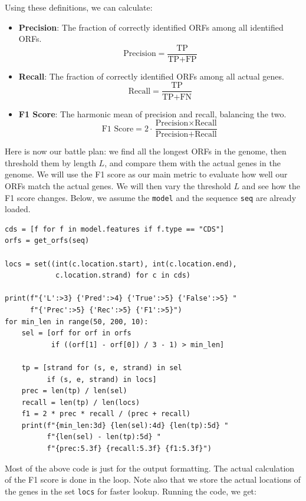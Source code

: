 Using these definitions, we can calculate:

\begin{itemize}
    \item \textbf{Precision}: The fraction of correctly identified ORFs among all identified ORFs.
    \[
    \text{Precision} = \frac{\text{TP}}{\text{TP} + \text{FP}}
    \]
    
    \item \textbf{Recall}: The fraction of correctly identified ORFs among all actual genes.
    \[
    \text{Recall} = \frac{\text{TP}}{\text{TP} + \text{FN}}
    \]
    
    \item \textbf{F1 Score}: The harmonic mean of precision and recall, balancing the two.
    \[
    \text{F1 Score} = 2 \cdot \frac{\text{Precision} \times \text{Recall}}{\text{Precision} + \text{Recall}}
    \]
\end{itemize}

Here is now our battle plan: we find all the longest ORFs in the genome, then threshold them by length $L$, and compare them with the actual genes in the genome. We will use the F1 score as our main metric to evaluate how well our ORFs match the actual genes. We will then vary the threshold $L$ and see how the F1 score changes. Below, we assume the \texttt{model} and the sequence \texttt{seq} are already loaded.

\vspace*{3mm}
\begin{lstlisting}
cds = [f for f in model.features if f.type == "CDS"]
orfs = get_orfs(seq)

locs = set((int(c.location.start), int(c.location.end),
            c.location.strand) for c in cds)

print(f"{'L':>3} {'Pred':>4} {'True':>5} {'False':>5} "
      f"{'Prec':>5} {'Rec':>5} {'F1':>5}")
for min_len in range(50, 200, 10):
    sel = [orf for orf in orfs 
           if ((orf[1] - orf[0]) / 3 - 1) > min_len]

    tp = [strand for (s, e, strand) in sel 
          if (s, e, strand) in locs]
    prec = len(tp) / len(sel)
    recall = len(tp) / len(locs)
    f1 = 2 * prec * recall / (prec + recall)
    print(f"{min_len:3d} {len(sel):4d} {len(tp):5d} "
          f"{len(sel) - len(tp):5d} "
          f"{prec:5.3f} {recall:5.3f} {f1:5.3f}")
\end{lstlisting}

Most of the above code is just for the output formatting. The actual calculation of the F1 score is done in the loop. Note also that we store the actual locations of the genes in the set \texttt{locs} for faster lookup. Running the code, we get:

